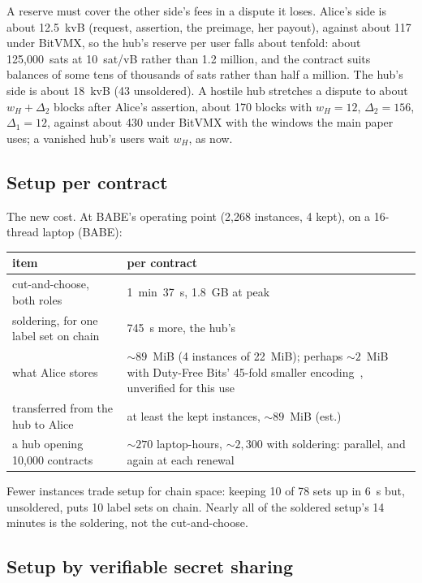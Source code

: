 \documentclass[11pt]{article}
\begin{document}
A reserve must cover the other side's fees in a dispute it loses. Alice's
side is about 12.5~kvB (request, assertion, the preimage, her payout),
against about 117 under BitVMX, so the hub's reserve per user falls
about tenfold: about 125,000~sats at 10~sat/vB rather than 1.2 million,
and the contract suits balances of some tens of thousands of sats
rather than half a million. The hub's side is about 18~kvB (43
unsoldered). A hostile hub stretches a dispute to about
$w_H + \Delta_2$ blocks after Alice's assertion, about 170 blocks with
$w_H = 12$, $\Delta_2 = 156$, $\Delta_1 = 12$, against about 430 under
BitVMX with the windows the main paper uses; a vanished hub's users wait
$w_H$, as now.

\subsection{Setup per contract}
\label{sec:setup}

The new cost. At BABE's operating point (2,268 instances, 4 kept), on a
16-thread laptop (BABE):
\begin{center}
\small
\begin{tabularx}{\linewidth}{>{\raggedright\arraybackslash}p{60mm}L}
\toprule
item & per contract \\
\midrule
cut-and-choose, both roles & 1~min~37~s, 1.8~GB at peak \\
soldering, for one label set on chain & 745~s more, the hub's \\
what Alice stores & ${\sim}89$~MiB (4 instances of 22~MiB); perhaps ${\sim}2$~MiB with Duty-Free Bits' 45-fold smaller encoding~\cite{dutyfree}, unverified for this use \\
transferred from the hub to Alice & at least the kept instances, ${\sim}89$~MiB (est.) \\
a hub opening 10,000 contracts & ${\sim}270$ laptop-hours, ${\sim}2{,}300$ with soldering: parallel, and again at each renewal \\
\bottomrule
\end{tabularx}
\end{center}
Fewer instances trade setup for chain space: keeping 10 of 78 sets up in
6~s but, unsoldered, puts 10 label sets on chain. Nearly all of the
soldered setup's 14 minutes is the soldering, not the cut-and-choose.

\subsection{Setup by verifiable secret sharing}
\label{sec:vsss}
\end{document}
